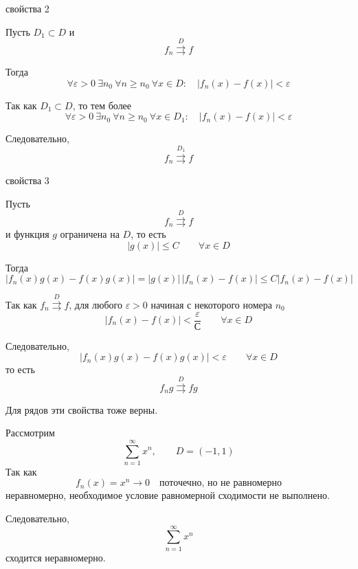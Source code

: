 \documentclass[12pt,a4paper]{article}
\begin{document}
\begin{proofbox}{свойства 2}

    Пусть $D_1\subset D$ и
    \[
        f_n\overset{D}{\rightrightarrows}f
    \]

    Тогда
    \[
        \forall\varepsilon>0\ \exists n_0\
        \forall n\geq n_0\
        \forall x\in D:
        \quad
        |f_n(x)-f(x)|<\varepsilon
    \]

    Так как $D_1\subset D$, то тем более
    \[
        \forall\varepsilon>0\ \exists n_0\
        \forall n\geq n_0\
        \forall x\in D_1:
        \quad
        |f_n(x)-f(x)|<\varepsilon
    \]

    Следовательно,
    \[
        f_n\overset{D_1}{\rightrightarrows}f
    \]

\end{proofbox}

\begin{proofbox}{свойства 3}

    Пусть
    \[
        f_n\overset{D}{\rightrightarrows}f
    \]
    и функция $g$ ограничена на $D$, то есть
    \[
        |g(x)|\leq C
        \qquad
        \forall x\in D
    \]

    Тогда
    \[
        |f_n(x)g(x)-f(x)g(x)|
        =
        |g(x)|\,|f_n(x)-f(x)|
        \leq
        C|f_n(x)-f(x)|
    \]

    Так как $f_n\overset{D}{\rightrightarrows}f$, для любого $\varepsilon>0$ начиная с некоторого номера $n_0$
    \[
        |f_n(x)-f(x)|<\frac{\varepsilon}{С}
        \qquad
        \forall x\in D
    \]

    Следовательно,
    \[
        |f_n(x)g(x)-f(x)g(x)|<\varepsilon
        \qquad
        \forall x\in D
    \]
    то есть
    \[
        f_ng\overset{D}{\rightrightarrows}fg
    \]

\end{proofbox}

\begin{note}

    Для рядов эти свойства тоже верны.

\end{note}

\begin{example}

    Рассмотрим
    \[
        \sum_{n=1}^{\infty}x^n,
        \qquad
        D=(-1,1)
    \]
    Так как
    \[
        f_n(x)=x^n\longrightarrow0\quad\text{поточечно, но не равномерно}
    \]
    неравномерно, необходимое условие равномерной сходимости не выполнено.

    Следовательно,
    \[
        \sum_{n=1}^{\infty}x^n
    \]
    сходится неравномерно.

\end{example}
\end{document}
